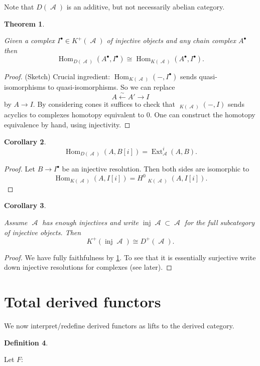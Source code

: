 \documentclass[10pt,]{book}
\theoremstyle{plain}
\newtheorem{theorem}{Theorem}[section]
\newtheorem{corollary}[theorem]{Corollary}
\theoremstyle{definition}
\newtheorem{definition}[theorem]{Definition}
\numberwithin{equation}{section}
\DeclareMathOperator{\Hom}{Hom}
\DeclareMathOperator{\cHom}{\underline{Hom}}
\DeclareMathOperator{\Ext}{Ext}
\DeclareMathOperator{\inj}{inj}
\DeclareMathOperator{\cA}{\mathcal{A}}
\begin{document}
          Note that \(D(\cA)\) is an additive, but not necessarily abelian category.
\begin{theorem}\label{thm-inj-der-hom}

            Given a complex \(I^\bullet \in K^+(\cA)\) of injective objects and any chain complex \(A^\bullet\) then \[\Hom_{D(\cA)}(A^\bullet , I^\bullet) \cong \Hom_{K(\cA)}(A^\bullet, I^\bullet).\]\end{theorem}
\begin{proof}

            (Sketch) Crucial ingredient: \(\Hom_{K(\cA)}(-, I ^\bullet)\) sends quasi-isomorphisms to quasi-isomorphisms.
            So we can replace 
            \[
              A \xleftarrow{\sim} A' \xrightarrow{} I
            \]
            by \(A \to I\).
            By considering cones it suffices to check that \(\cHom_{K(\cA)}(-, I)\) sends acyclics to complexes homotopy equivalent to \(0\).
            One can construct the homotopy equivalence by hand, using injectivity.
          \end{proof}
\begin{corollary}\label{corollary-5}
\[
              \Hom_{D(\cA)}(A,B[i]) = \Ext^i_{\cA}(A,B).
            \]\end{corollary}
\begin{proof}

            Let \(B \to I^\bullet\) be an injective resolution.
            Then both sides are isomorphic to 
            \[
              \Hom_{K(\cA)}(A,I[i]) = H^0 \cHom_{K(\cA)}(A, I[i]).
            \]\end{proof}
\begin{corollary}\label{corollary-6}

            Assume \(\cA\) has enough injectives and write \(\inj \cA \subset \cA\) for the full subcategory of injective objects.
            Then
            \[
              K^+(\inj \cA) \cong D^+(\cA).
            \]\end{corollary}
\begin{proof}

            We have fully faithfulness by \ref{thm-inj-der-hom}.
            To see that it is essentially surjective write down injective resolutions for complexes (see later).
          \end{proof}
\typeout{************************************************}
\typeout{************************************************}
\section[Total derived functors]{Total derived functors}\label{sec-total-derived}
We now interpret/redefine derived functors as lifts to the derived category.%
\begin{definition}\label{definition-24}

            Let \(F\colon\)\end{definition}
\typeout{************************************************}
\typeout{************************************************}
\end{document}
